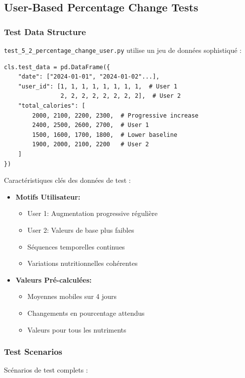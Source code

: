 \subsection{User-Based Percentage Change Tests}

\subsubsection{Test Data Structure}
\texttt{test\_5\_2\_percentage\_change\_user.py} utilise un jeu de données sophistiqué :

\begin{lstlisting}[style=pythonstyle, caption=User Test Data Setup]
cls.test_data = pd.DataFrame({
    "date": ["2024-01-01", "2024-01-02"...],
    "user_id": [1, 1, 1, 1, 1, 1, 1, 1,  # User 1
                2, 2, 2, 2, 2, 2, 2, 2],  # User 2
    "total_calories": [
        2000, 2100, 2200, 2300,  # Progressive increase
        2400, 2500, 2600, 2700,  # User 1
        1500, 1600, 1700, 1800,  # Lower baseline
        1900, 2000, 2100, 2200   # User 2
    ]
})
\end{lstlisting}

Caractéristiques clés des données de test :
\begin{itemize}
    \item \textbf{Motifs Utilisateur:}
    \begin{itemize}
        \item User 1: Augmentation progressive régulière
        \item User 2: Valeurs de base plus faibles
        \item Séquences temporelles continues
        \item Variations nutritionnelles cohérentes
    \end{itemize}
    
    \item \textbf{Valeurs Pré-calculées:}
    \begin{itemize}
        \item Moyennes mobiles sur 4 jours
        \item Changements en pourcentage attendus
        \item Valeurs pour tous les nutriments
    \end{itemize}
\end{itemize}

\subsubsection{Test Scenarios}
Scénarios de test complets :

